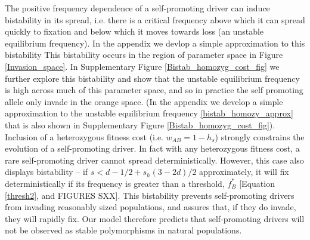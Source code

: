 \documentclass[12pt,letterpaper]{article}
\newcommand{\yb}[1]{{ \color{blue} #1}}
\begin{document}
The positive frequency dependence of a self-promoting driver can
induce bistability in its spread, i.e. there is a critical frequency
above which it can spread quickly to fixation and below which it moves towards loss (an
unstable equilibrium frequency). In 
the appendix we devlop a simple
approximation to this bistability 
This bistability occurs in the region of parameter space in Figure
\ref{Invasion_space}. In Supplementary Figure
\ref{Bistab_homozyg_cost_fig} we further explore this bistability and
show that the unstable equilibrium frequency is high across much of
this parameter space, and so in practice the self promoting allele
only invade in the orange space. (In the appendix we develop a simple
approximation to the unstable equilibrium frequency
\eqref{bistab_homozy_approx} that is also shown in  Supplementary Figure
\ref{Bistab_homozyg_cost_fig}).
Inclusion of a heterozygous fitness cost (i.e. $w_{AB}=1-h_s$)
strongly constrains the evolution of a self-promoting driver. 
In fact with any heterozygous fitness cost, a rare self-promoting
driver cannot spread deterministically. However, this case also displays bistability -- 
if $s < d - 1/2+s_h(3-2d)/2$ approximately, it will fix deterministically if its 
	frequency is greater than a threshold, $f_B^*$ [Equation \eqref{thresh2}, and \yb{FIGURES SXX}].
This bistability prevents self-promoting drivers from invading 	
	reasonably sized populations, and assures that, if they do invade, they will rapidly fix.
Our model therefore predicts that self-promoting drivers will not be
observed as stable polymorphisms in natural populations. 
\end{document}
